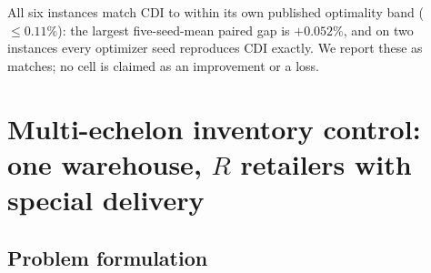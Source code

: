 \documentclass[11pt]{article}
\begin{document}
\begin{table}[!htbp]
\centering
\small
\caption{Dual-sourcing: learned soft-tree policy vs.\ the capped dual-index (CDI) optimal proxy.
Learned cells are the mean $\pm$ sample standard deviation across $N=5$ independent CMA-ES optimizer
seeds; every policy is scored under paired common-random-number evaluation ($80$ demand-path seeds,
horizon $10^5$). $\Delta\%$ is the per-seed paired gap to CDI (negative is better); the A3C row
reports the published optimality gap from \citet{gijsbrechts2022drl}.}
\label{tab:ds-results}
\par\medskip\footnotesize All six instances match CDI to within its own published optimality band
($\le0.11\%$): the largest five-seed-mean paired gap is $+0.052\%$, and on two instances every
optimizer seed reproduces CDI exactly. We report these as matches; no cell is claimed as an
improvement or a loss.
\end{table}
\FloatBarrier

\section{Multi-echelon inventory control: one warehouse, $R$ retailers with special delivery}
\label{sec:multiechelon}

\subsection{Problem formulation}
\end{document}
